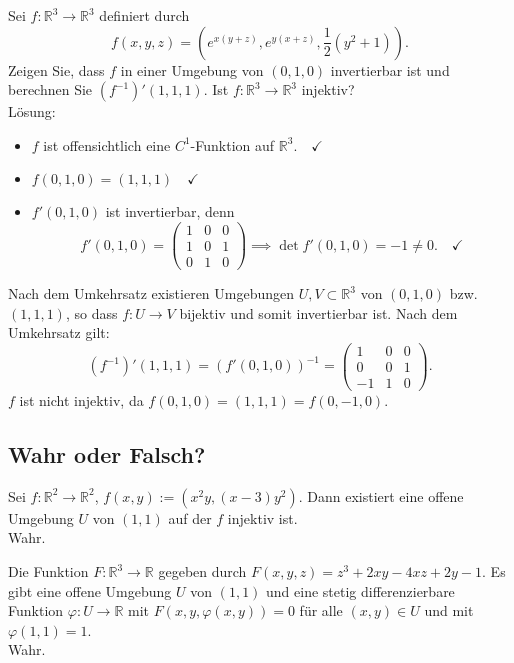 Sei $f : \mathbb{R}^3 \to \mathbb{R}^3$ definiert durch
\begin{displaymath}
  f(x,y,z) = \left(e^{x(y + z)}, e^{y(x + z)}, \frac{1}{2}(y^2 + 1)\right).
\end{displaymath}
Zeigen Sie, dass $f$ in einer Umgebung von $(0,1,0)$ invertierbar ist und berechnen Sie $(f^{-1})'(1,1,1)$.
Ist $f : \mathbb{R}^3 \to \mathbb{R}^3$ injektiv?\\
Lösung:
\begin{itemize}
    \item $f$ ist offensichtlich eine $C^1$-Funktion auf $\mathbb{R}^3. \quad \checkmark$
    \item $f(0,1,0) = (1,1,1) \quad \checkmark$
    \item $f'(0,1,0)$ ist invertierbar, denn
    \begin{displaymath}
      f'(0,1,0) = 
      \begin{pmatrix}
        1 & 0 & 0\\
        1 & 0 & 1\\
        0 & 1 & 0
      \end{pmatrix}
      \implies \det f'(0,1,0) = -1 \neq 0. \quad \checkmark
    \end{displaymath}
\end{itemize}
Nach dem Umkehrsatz existieren Umgebungen $U,V \subset \mathbb{R}^3$ von $(0,1,0)$ bzw. $(1,1,1)$, so dass $f : U \to V$ bijektiv und somit invertierbar ist.
Nach dem Umkehrsatz gilt:
\begin{displaymath}
  (f^{-1})'(1,1,1) = (f'(0,1,0))^{-1} =
  \begin{pmatrix}
    1 & 0 & 0\\
    0 & 0 & 1\\
    -1 & 1 & 0
  \end{pmatrix}.
\end{displaymath}
$f$ ist nicht injektiv, da $f(0,1,0) = (1,1,1) = f(0,-1,0)$.

\subsection{Wahr oder Falsch?}
Sei $f : \mathbb{R}^2 \to \mathbb{R}^2$, $f(x,y) := (x^2y, (x-3)y^2)$.
Dann existiert eine offene Umgebung $U$ von $(1,1)$ auf der $f$ injektiv ist.\\
Wahr.

Die Funktion $F : \mathbb{R}^3 \to \mathbb{R}$ gegeben durch $F(x,y,z) = z^3 + 2xy - 4xz + 2y - 1$.
Es gibt eine offene Umgebung $U$ von $(1,1)$ und eine stetig differenzierbare Funktion $\varphi : U \to \mathbb{R}$ mit $F(x,y,\varphi(x,y)) = 0$ für alle $(x,y) \in U$ und mit $\varphi(1,1) = 1$.\\
Wahr.

